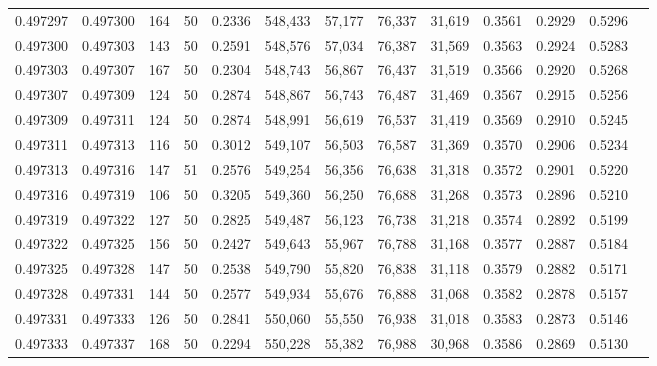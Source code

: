 \begin{tabular}{rrrrrrrrrrrrr}
0.497297 & 0.497300 &   164 &  50 &                                     0.2336 & 548,433 &  57,177 &  76,337 &  31,619 & 0.3561 & 0.2929 & 0.5296 \\
0.497300 & 0.497303 &   143 &  50 &                                     0.2591 & 548,576 &  57,034 &  76,387 &  31,569 & 0.3563 & 0.2924 & 0.5283 \\
0.497303 & 0.497307 &   167 &  50 &                                     0.2304 & 548,743 &  56,867 &  76,437 &  31,519 & 0.3566 & 0.2920 & 0.5268 \\
0.497307 & 0.497309 &   124 &  50 &                                     0.2874 & 548,867 &  56,743 &  76,487 &  31,469 & 0.3567 & 0.2915 & 0.5256 \\
0.497309 & 0.497311 &   124 &  50 &                                     0.2874 & 548,991 &  56,619 &  76,537 &  31,419 & 0.3569 & 0.2910 & 0.5245 \\
0.497311 & 0.497313 &   116 &  50 &                                     0.3012 & 549,107 &  56,503 &  76,587 &  31,369 & 0.3570 & 0.2906 & 0.5234 \\
0.497313 & 0.497316 &   147 &  51 &                                     0.2576 & 549,254 &  56,356 &  76,638 &  31,318 & 0.3572 & 0.2901 & 0.5220 \\
0.497316 & 0.497319 &   106 &  50 &                                     0.3205 & 549,360 &  56,250 &  76,688 &  31,268 & 0.3573 & 0.2896 & 0.5210 \\
0.497319 & 0.497322 &   127 &  50 &                                     0.2825 & 549,487 &  56,123 &  76,738 &  31,218 & 0.3574 & 0.2892 & 0.5199 \\
0.497322 & 0.497325 &   156 &  50 &                                     0.2427 & 549,643 &  55,967 &  76,788 &  31,168 & 0.3577 & 0.2887 & 0.5184 \\
0.497325 & 0.497328 &   147 &  50 &                                     0.2538 & 549,790 &  55,820 &  76,838 &  31,118 & 0.3579 & 0.2882 & 0.5171 \\
0.497328 & 0.497331 &   144 &  50 &                                     0.2577 & 549,934 &  55,676 &  76,888 &  31,068 & 0.3582 & 0.2878 & 0.5157 \\
0.497331 & 0.497333 &   126 &  50 &                                     0.2841 & 550,060 &  55,550 &  76,938 &  31,018 & 0.3583 & 0.2873 & 0.5146 \\
0.497333 & 0.497337 &   168 &  50 &                                     0.2294 & 550,228 &  55,382 &  76,988 &  30,968 & 0.3586 & 0.2869 & 0.5130 \\

\end{tabular}
